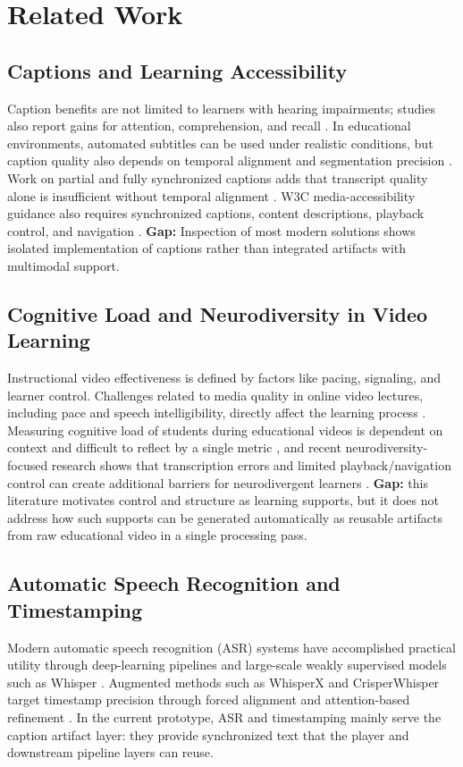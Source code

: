 ﻿\documentclass[conference]{IEEEtran}
\begin{document}
\section{Related Work}
\subsection{Captions and Learning Accessibility}
Caption benefits are not limited to learners with hearing impairments; studies also report gains for attention, comprehension, and recall \cite{Gernsbacher2015}. In educational environments, automated subtitles can be used under realistic conditions, but caption quality also depends on temporal alignment and segmentation precision \cite{Malakul2023}. Work on partial and fully synchronized captions adds that transcript quality alone is insufficient without temporal alignment \cite{Mirzaei2018}. W3C media-accessibility guidance also requires synchronized captions, content descriptions, playback control, and navigation \cite{W3CMediaReqs}. \textbf{Gap:} Inspection of most modern solutions shows isolated implementation of captions rather than integrated artifacts with multimodal support.

\subsection{Cognitive Load and Neurodiversity in Video Learning}
Instructional video effectiveness is defined by factors like pacing, signaling, and learner control. Challenges related to media quality in online video lectures, including pace and speech intelligibility, directly affect the learning process \cite{Lange2020}. Measuring cognitive load of students during educational videos is dependent on context and difficult to reflect by a single metric \cite{Kruger2016}, and recent neurodiversity-focused research shows that transcription errors and limited playback/navigation control can create additional barriers for neurodivergent learners \cite{LeCunff2024,Horlin2024}. \textbf{Gap:} this literature motivates control and structure as learning supports, but it does not address how such supports can be generated automatically as reusable artifacts from raw educational video in a single processing pass.

\subsection{Automatic Speech Recognition and Timestamping}
Modern automatic speech recognition (ASR) systems have accomplished practical utility through deep-learning pipelines \cite{Malik2020} and large-scale weakly supervised models such as Whisper \cite{Radford2022}. Augmented methods such as WhisperX and CrisperWhisper target timestamp precision through forced alignment and attention-based refinement \cite{Bain2023,Wagner2024}. In the current prototype, ASR and timestamping mainly serve the caption artifact layer: they provide synchronized text that the player and downstream pipeline layers can reuse.
\end{document}
